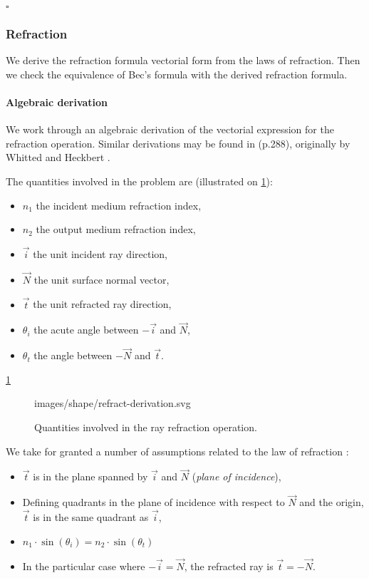 $\square$

\subsubsection{Refraction}
We derive the refraction formula vectorial form from the laws of refraction.
Then we check the equivalence of Bec's formula with the derived refraction
formula.

\paragraph{Algebraic derivation}
We work through an algebraic derivation of the vectorial expression for
the refraction operation. Similar derivations may be found in
\cite{Glassner:1989} (p.288), originally by Whitted \cite{Whitted:2005}
and Heckbert \cite{Heckbert:1984}.

The quantities involved in the problem are (illustrated on
\cref{fig:refract-derivation}):

\begin{itemize}
\item $n_1$ the incident medium refraction index,
\item $n_2$ the output medium refraction index,
\item $\overrightarrow{i}$ the unit incident ray direction,
\item $\overrightarrow{N}$ the unit surface normal vector,
\item $\overrightarrow{t}$ the unit refracted ray direction,
\item $\theta_i$ the acute angle between $-\overrightarrow{i}$
and $\overrightarrow{N}$,
\item $\theta_t$ the angle between $-\overrightarrow{N}$ and
$\overrightarrow{t}$.
\end{itemize}

\cref{fig:refract-derivation}
\begin{figure} \caption{\label{fig:refract-derivation} Quantities involved
in the ray refraction operation.}

           {images/shape/refract-derivation.svg}
\end{figure}

We take for granted a number of assumptions related to the law of refraction
\cite{wiki:snell-refraction}:

\begin{itemize}
\item $\overrightarrow{t}$ is in the plane spanned by $\overrightarrow{i}$
and $\overrightarrow{N}$ (\emph{plane of incidence}),
\item Defining quadrants in the plane of incidence with respect to
$\overrightarrow{N}$ and the origin, $\overrightarrow{t}$ is in
the same quadrant as $\overrightarrow{i}$,
\item $n_1 \cdot \sin(\theta_i) = n_2 \cdot \sin(\theta_t)$
\item In the particular case where $-\overrightarrow{i} = \overrightarrow{N}$,
      the refracted ray is $\overrightarrow{t} = - \overrightarrow{N}$.
\end{itemize}


